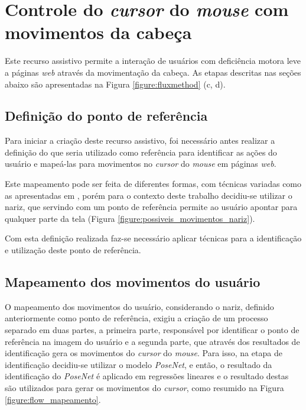 \section{Controle do \textit{cursor} do \textit{mouse} com movimentos da cabeça}

\par Este recurso assistivo permite a interação de usuários com deficiência motora leve a páginas \textit{web} através da movimentação da cabeça. As etapas descritas nas seções abaixo são apresentadas na Figura \ref{figure:fluxmethod} (c, d).

\subsection{Definição do ponto de referência}

\par Para iniciar a criação deste recurso assistivo, foi necessário antes realizar a definição do que seria utilizado como referência para identificar as ações do usuário e mapeá-las para movimentos no \textit{cursor} do \textit{mouse} em páginas \textit{web}.

\par Este mapeamento pode ser feita de diferentes formas, com técnicas variadas como as apresentadas em \cite{Griffin, Papoutsaki2016}, porém para o contexto deste trabalho decidiu-se utilizar o nariz, que servindo com um ponto de referência permite ao usuário apontar para qualquer parte da tela (Figura \ref{figure:possiveis_movimentos_nariz}).


\par Com esta definição realizada faz-se necessário aplicar técnicas para a identificação e utilização deste ponto de referência. 

\subsection{Mapeamento dos movimentos do usuário}

\par O mapeamento dos movimentos do usuário, considerando o nariz, definido anteriormente como ponto de referência, exigiu a criação de um processo separado em duas partes, a primeira parte, responsável por identificar o ponto de referência na imagem do usuário e a segunda parte, que através dos resultados de identificação gera os movimentos do \textit{cursor} do \textit{mouse}. Para isso, na etapa de identificação decidiu-se utilizar o modelo \textit{PoseNet}, e então, o resultado da identificação do \textit{PoseNet} é aplicado em regressões lineares e o resultado destas são utilizados para gerar os movimentos do \textit{cursor}, como resumido na Figura \ref{figure:flow_mapeamento}.

